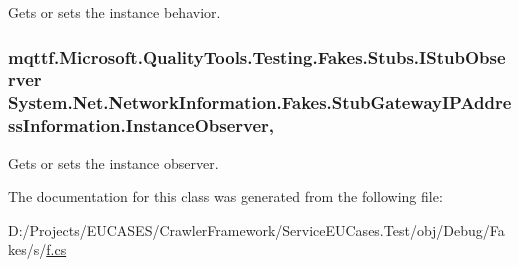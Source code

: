 Gets or sets the instance behavior.

\hypertarget{class_system_1_1_net_1_1_network_information_1_1_fakes_1_1_stub_gateway_i_p_address_information_ad49e8aa329c5b9b0bd51ceed0f347805}{
\subsubsection[{Instance\-Observer}]{\setlength{\rightskip}{0pt plus 5cm}mqttf.\-Microsoft.\-Quality\-Tools.\-Testing.\-Fakes.\-Stubs.\-I\-Stub\-Observer System.\-Net.\-Network\-Information.\-Fakes.\-Stub\-Gateway\-I\-P\-Address\-Information.\-Instance\-Observer\hspace{0.3cm}{\ttfamily [get]}, {\ttfamily [set]}}}\label{class_system_1_1_net_1_1_network_information_1_1_fakes_1_1_stub_gateway_i_p_address_information_ad49e8aa329c5b9b0bd51ceed0f347805}


Gets or sets the instance observer.



The documentation for this class was generated from the following file\-:\begin{DoxyCompactItemize}
\item 
D\-:/\-Projects/\-E\-U\-C\-A\-S\-E\-S/\-Crawler\-Framework/\-Service\-E\-U\-Cases.\-Test/obj/\-Debug/\-Fakes/s/\hyperlink{s_2f_8cs}{f.\-cs}\end{DoxyCompactItemize}
